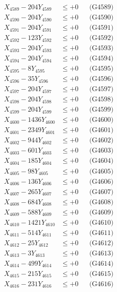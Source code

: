 \documentclass[a4paper,10pt]{article}
\begin{document}
{\begin{align}
X_{4589} - 204Y_{4589} &\leq +0 && \text{(G4589)} \\
X_{4590} - 204Y_{4590} &\leq +0 && \text{(G4590)} \\
\allowbreak
X_{4591} - 204Y_{4591} &\leq +0 && \text{(G4591)} \\
X_{4592} - 123Y_{4592} &\leq +0 && \text{(G4592)} \\
X_{4593} - 204Y_{4593} &\leq +0 && \text{(G4593)} \\
X_{4594} - 204Y_{4594} &\leq +0 && \text{(G4594)} \\
X_{4595} - 8Y_{4595} &\leq +0 && \text{(G4595)} \\
X_{4596} - 35Y_{4596} &\leq +0 && \text{(G4596)} \\
X_{4597} - 204Y_{4597} &\leq +0 && \text{(G4597)} \\
X_{4598} - 204Y_{4598} &\leq +0 && \text{(G4598)} \\
X_{4599} - 204Y_{4599} &\leq +0 && \text{(G4599)} \\
X_{4600} - 1436Y_{4600} &\leq +0 && \text{(G4600)} \\
\allowbreak
X_{4601} - 2349Y_{4601} &\leq +0 && \text{(G4601)} \\
X_{4602} - 944Y_{4602} &\leq +0 && \text{(G4602)} \\
X_{4603} - 601Y_{4603} &\leq +0 && \text{(G4603)} \\
X_{4604} - 185Y_{4604} &\leq +0 && \text{(G4604)} \\
X_{4605} - 98Y_{4605} &\leq +0 && \text{(G4605)} \\
X_{4606} - 136Y_{4606} &\leq +0 && \text{(G4606)} \\
X_{4607} - 265Y_{4607} &\leq +0 && \text{(G4607)} \\
X_{4608} - 684Y_{4608} &\leq +0 && \text{(G4608)} \\
X_{4609} - 588Y_{4609} &\leq +0 && \text{(G4609)} \\
X_{4610} - 1421Y_{4610} &\leq +0 && \text{(G4610)} \\
\allowbreak
X_{4611} - 514Y_{4611} &\leq +0 && \text{(G4611)} \\
X_{4612} - 25Y_{4612} &\leq +0 && \text{(G4612)} \\
X_{4613} - 3Y_{4613} &\leq +0 && \text{(G4613)} \\
X_{4614} - 499Y_{4614} &\leq +0 && \text{(G4614)} \\
X_{4615} - 215Y_{4615} &\leq +0 && \text{(G4615)} \\
X_{4616} - 231Y_{4616} &\leq +0 && \text{(G4616)} \\

\end{align}}
\end{document}
